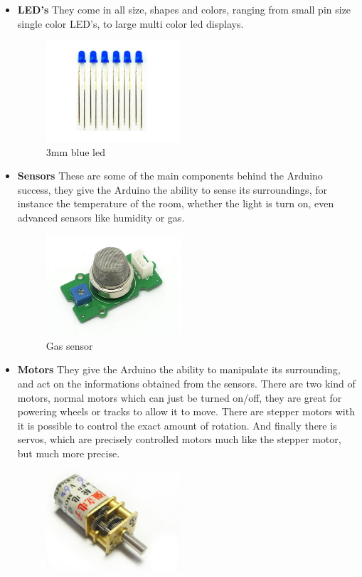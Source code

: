 \begin{itemize}
\item[] \textbf{LED's} They come in all size, shapes and colors, ranging from small pin size single color LED's, to large multi color led displays.
\begin{figure}[hbtp]
\centering
\includegraphics[width=5cm]{billeder/led.jpg}
\caption{3mm blue led}
\end{figure}
\item[] \textbf{Sensors} These are some of the main components behind the Arduino success, they give the Arduino the ability to sense its surroundings, for instance the temperature of the room, whether the light is turn on, even advanced sensors like humidity or gas.
\begin{figure}[hbtp]
\centering
\includegraphics[width=5cm]{billeder/Sensor.jpg}
\caption{Gas sensor}
\end{figure}
\item[] \textbf{Motors} They give the Arduino the ability to manipulate its surrounding, and act on the informations obtained from the sensors. There are two kind of motors, normal motors which can just be turned on/off, they are great for powering wheels or tracks to allow it to move. There are stepper motors with it is possible to control the exact amount of rotation. And finally there is servos, which are precisely controlled motors much like the stepper motor, but much more precise.
\begin{figure}[hbtp]
\centering
\includegraphics[width=5cm]{billeder/Motor.jpg}

\end{figure}
\end{itemize}
